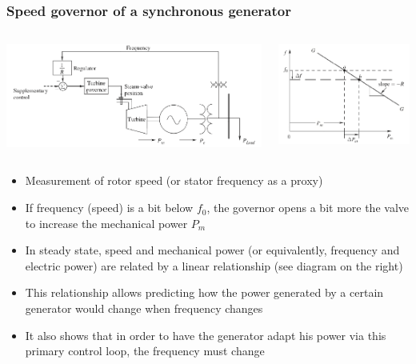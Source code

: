 \begin{frame}
    \frametitle{Speed governor of a synchronous generator}
    \begin{columns}
        \begin{column}{0.55\textwidth}
            \includegraphics[width=\textwidth]{images/governor.png}
        \end{column}
        \begin{column}{0.4\textwidth}
            \includegraphics[width=\textwidth]{images/droop-1gen.png}
        \end{column}
    \end{columns}
    \begin{itemize}
        \item Measurement of rotor speed (or stator frequency as a proxy)
        \item If frequency (speed) is a bit below $f_0$, the governor opens a bit more the valve to increase the mechanical power $P_m$
        \item In steady state, speed and mechanical power (or equivalently, frequency and electric power) are related by a linear relationship (see diagram on the right)
        \item This relationship allows predicting how the power generated by a certain generator would change when frequency changes
        \item It also shows that in order to have the generator adapt his power via this primary control loop, the frequency must change
    \end{itemize}
\end{frame}

